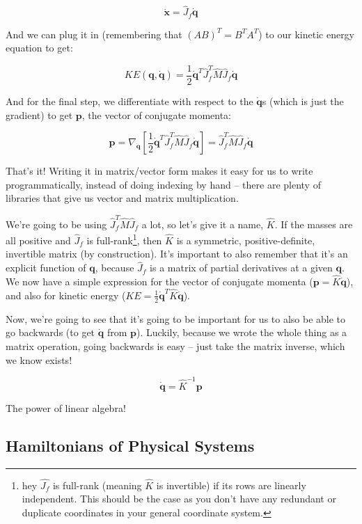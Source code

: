 \documentclass[]{article}
\begin{document}
\[
\dot{\mathbf{x}} = \hat{J}_f \dot{\mathbf{q}}
\]

And we can plug it in (remembering that \((A B)^T = B^T A^T\)) to our kinetic
energy equation to get:

\[
KE(\mathbf{q},\dot{\mathbf{q}}) = \frac{1}{2} \dot{\mathbf{q}}^T \hat{J}_f^T
    \hat{M} \hat{J}_f \dot{\mathbf{q}}
\]

And for the final step, we differentiate with respect to the
\(\dot{\mathbf{q}}\)s (which is just the gradient) to get \(\mathbf{p}\), the
vector of conjugate momenta:

\[
\mathbf{p} = \nabla_{\dot{\mathbf{q}}} \left[
    \frac{1}{2} \dot{\mathbf{q}}^T \hat{J}_f^T \hat{M} \hat{J}_f \dot{\mathbf{q}}
  \right]
  = \hat{J}_f^T \hat{M} \hat{J}_f \dot{\mathbf{q}}
\]

That's it! Writing it in matrix/vector form makes it easy for us to write
programmatically, instead of doing indexing by hand -- there are plenty of
libraries that give us vector and matrix multiplication.

We're going to be using \(\hat{J}_f^T \hat{M} \hat{J}_f\) a lot, so let's give
it a name, \(\hat{K}\). If the masses are all positive and \(\hat{J}_f\) is
full-rank\footnote{hey \(\hat{J_f}\) is full-rank (meaning \(\hat{K}\) is
  invertible) if its rows are linearly independent. This should be the case as
  you don't have any redundant or duplicate coordinates in your general
  coordinate system.}, then \(\hat{K}\) is a symmetric, positive-definite,
invertible matrix (by construction). It's important to also remember that it's
an explicit function of \(\mathbf{q}\), because \(\hat{J}_f\) is a matrix of
partial derivatives at a given \(\mathbf{q}\). We now have a simple expression
for the vector of conjugate momenta (\(\mathbf{p} = \hat{K} \dot{\mathbf{q}}\)),
and also for kinetic energy
(\(KE = \frac{1}{2} \dot{\mathbf{q}}^T \hat{K} \dot{\mathbf{q}}\)).

Now, we're going to see that it's going to be important for us to also be able
to go backwards (to get \(\dot{\mathbf{q}}\) from \(\mathbf{p}\)). Luckily,
because we wrote the whole thing as a matrix operation, going backwards is easy
-- just take the matrix inverse, which we know exists!

\[
\dot{\mathbf{q}} = \hat{K}^{-1} \mathbf{p}
\]

The power of linear algebra!

\subsection{Hamiltonians of Physical
Systems}\label{hamiltonians-of-physical-systems}
\end{document}
